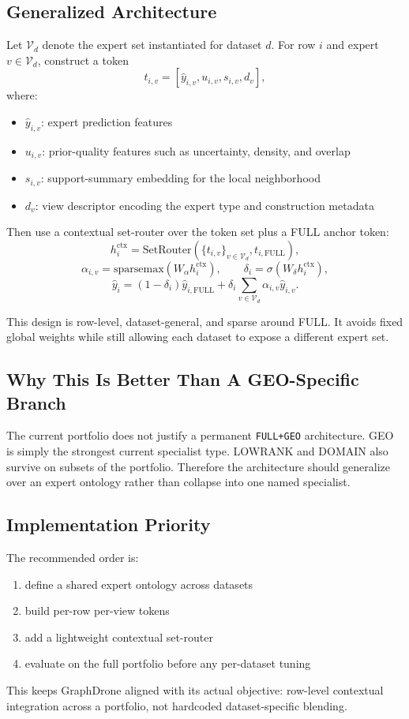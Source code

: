 \subsection{Generalized Architecture}

Let \(\mathcal{V}_d\) denote the expert set instantiated for dataset \(d\). For row \(i\) and expert \(v \in \mathcal{V}_d\), construct a token
\[
t_{i,v} = [\hat y_{i,v}, u_{i,v}, s_{i,v}, d_v],
\]
where:
\begin{itemize}
\item \(\hat y_{i,v}\): expert prediction features
\item \(u_{i,v}\): prior-quality features such as uncertainty, density, and overlap
\item \(s_{i,v}\): support-summary embedding for the local neighborhood
\item \(d_v\): view descriptor encoding the expert type and construction metadata
\end{itemize}

Then use a contextual set-router over the token set plus a FULL anchor token:
\[
h_i^{\mathrm{ctx}} = \mathrm{SetRouter}(\{t_{i,v}\}_{v \in \mathcal{V}_d}, t_{i,\mathrm{FULL}}),
\]
\[
\alpha_{i,v} = \mathrm{sparsemax}(W_\alpha h_i^{\mathrm{ctx}}), \qquad
\delta_i = \sigma(W_\delta h_i^{\mathrm{ctx}}),
\]
\[
\hat y_i = (1-\delta_i)\hat y_{i,\mathrm{FULL}} + \delta_i \sum_{v \in \mathcal{V}_d} \alpha_{i,v}\hat y_{i,v}.
\]

This design is row-level, dataset-general, and sparse around FULL. It avoids fixed global weights while still allowing each dataset to expose a different expert set.

\subsection{Why This Is Better Than A GEO-Specific Branch}

The current portfolio does not justify a permanent \texttt{FULL+GEO} architecture. GEO is simply the strongest current specialist type. LOWRANK and DOMAIN also survive on subsets of the portfolio. Therefore the architecture should generalize over an expert ontology rather than collapse into one named specialist.

\subsection{Implementation Priority}

The recommended order is:
\begin{enumerate}
\item define a shared expert ontology across datasets
\item build per-row per-view tokens
\item add a lightweight contextual set-router
\item evaluate on the full portfolio before any per-dataset tuning
\end{enumerate}

This keeps GraphDrone aligned with its actual objective: row-level contextual integration across a portfolio, not hardcoded dataset-specific blending.
